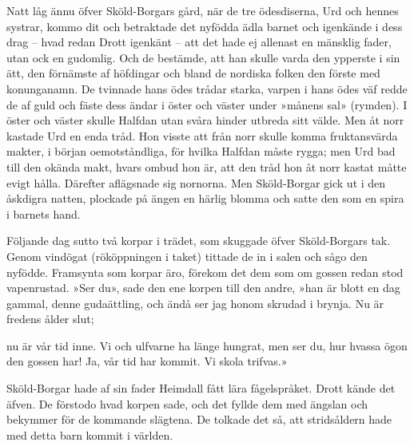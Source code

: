 Natt låg ännu öfver Sköld-Borgars gård, när de tre ödesdiserna, Urd och
hennes systrar, kommo dit och betraktade det nyfödda ädla barnet och
igenkände i dess drag -- hvad redan Drott igenkänt -- att det hade ej
allenast en mänsklig fader, utan ock en gudomlig. Och de bestämde, att
han skulle varda den ypperste i sin ätt, den förnämste af höfdingar och
bland de nordiska folken den förste med konunganamn. De tvinnade hans
ödes trådar starka, varpen i hans ödes väf redde de af guld och fäste
dess ändar i öster och väster under »månens sal» (rymden). I öster och
väster skulle Halfdan utan svåra hinder utbreda sitt välde. Men åt norr
kastade Urd en enda tråd. Hon visste att från norr skulle komma
fruktansvärda makter, i början oemotståndliga, för hvilka Halfdan måste
rygga; men Urd bad till den okända makt, hvars ombud hon är, att den
tråd hon åt norr kastat måtte evigt hålla. Därefter aflägsnade sig
nornorna. Men Sköld-Borgar gick ut i den åskdigra natten, plockade på
ängen en härlig blomma och satte den som en spira i barnets hand.

Följande dag sutto två korpar i trädet, som skuggade öfver Sköld-Borgars
tak. Genom vindögat (rököppningen i taket) tittade de in i salen och
sågo den nyfödde. Framsynta som korpar äro, förekom det dem som om
gossen redan stod vapenrustad. »Ser du», sade den ene korpen till den
andre, »han är blott en dag gammal, denne gudaättling, och ändå ser jag
honom skrudad i brynja. Nu är fredens ålder slut;

nu är vår tid inne. Vi och ulfvarne ha länge hungrat, men ser du, hur
hvassa ögon den gossen har! Ja, vår tid har kommit. Vi skola trifvas.»

Sköld-Borgar hade af sin fader Heimdall fått lära fågelspråket. Drott
kände det äfven. De förstodo hvad korpen sade, och det fyllde dem med
ängslan och bekymmer för de kommande slägtena. De tolkade det så, att
stridsåldern hade med detta barn kommit i världen.

